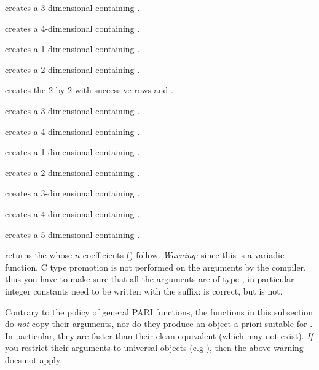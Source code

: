  creates a 3-dimensional 
containing .

 creates a 4-dimensional
 containing .

 creates a 1-dimensional 
containing .

 creates a 2-dimensional 
containing .

 creates the $2$ by $2$
 with successive rows  and
.

 creates a 3-dimensional 
containing .

 creates a 4-dimensional
 containing .

 creates a 1-dimensional 
containing .

 creates a 2-dimensional 
containing \kbd{[x, y]}.

 creates a 3-dimensional
 containing \kbd{[x, y, z]}.

 creates a 4-dimensional
 containing \kbd{[x, y, z, t]}.

 creates a
5-dimensional  containing \kbd{[x, y, z, t, u]}.

 returns the  whose $n$
coefficients () follow.
\emph{Warning:} since this is a variadic function, C type promotion is not
performed on the arguments by the compiler, thus you have to make sure that all
the arguments are of type , in particular integer constants need to
be written with the  suffix:  is correct,
but  is not.

\label{se:unclean}

Contrary to the policy of general PARI functions, the functions in this
subsection do \emph{not} copy their arguments, nor do they produce an object
a priori suitable for . In particular, they are
faster than their clean equivalent (which may not exist). \emph{If} you
restrict their arguments to universal objects (e.g ),
then the above warning does not apply.

